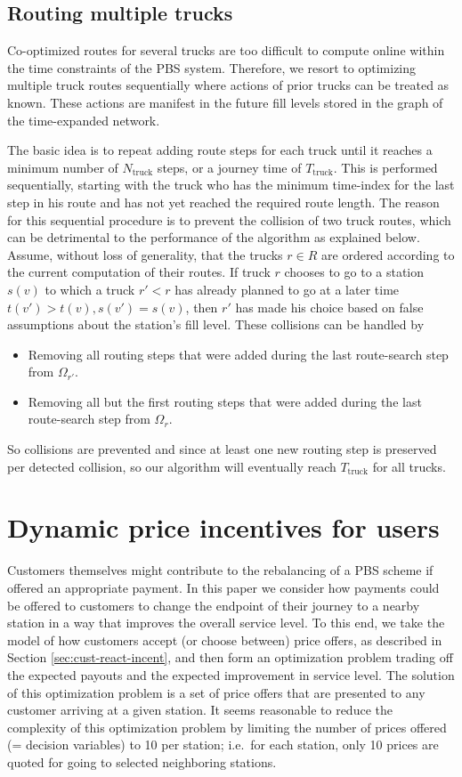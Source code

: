\documentclass{article}
\providecommand{\Ntruck}{N_{\textrm{truck}}}
\providecommand{\Ttruck}{T_{\textrm{truck}}}
\begin{document}
\subsection{Routing multiple trucks}\label{sec:multiple}
Co-optimized routes for several trucks are too difficult to compute online
within the time constraints of the PBS system. Therefore, we resort to
optimizing multiple truck routes sequentially where actions of prior trucks can
be treated as known. These actions are manifest in the future fill levels stored
in the graph of the time-expanded network.

The basic idea is to repeat adding route steps for each truck until it reaches a
minimum number of $\Ntruck$ steps, or a journey time of $\Ttruck$. This is
performed sequentially, starting with the truck who has the minimum time-index
for the last step in his route and has not yet reached the required route
length. The reason for this sequential procedure is to prevent the collision of
two truck routes, which can be detrimental to the performance of the algorithm
as explained below. Assume, without loss of generality, that the trucks $r\in R$
are ordered according to the current computation of their routes. If truck $r$
chooses to go to a station $s(v)$ to which a truck $r'<r$ has already planned to
go at a later time $t(v')>t(v), s(v') = s(v)$, then $r'$ has made his choice
based on false assumptions about the station's fill level. These collisions can
be handled by
\begin{itemize}
\item Removing all routing steps that were added during the last route-search
  step from $\Omega_{r'}$.
\item Removing all but the first routing steps that were added during the last
  route-search step from $\Omega_r$.
\end{itemize}

So collisions are prevented and since at least one new routing step is preserved
per detected collision, so our algorithm will eventually reach $\Ttruck$ for all
trucks.

\section{Dynamic price incentives for users}
\label{sec:pricing}

Customers themselves might contribute to the rebalancing of a PBS scheme if
offered an appropriate payment. In this paper we consider how payments could be
offered to customers to change the endpoint of their journey to a nearby station
in a way that improves the overall service level. To this end, we take the model
of how customers accept (or choose between) price offers, as described in
Section \ref{sec:cust-react-incent}, and then form an optimization problem
trading off the expected payouts and the expected improvement in service level.
The solution of this optimization problem is a set of price offers that are presented
to any customer arriving at a given station. It seems reasonable to reduce the
complexity of this optimization problem by limiting the number of prices offered
(= decision variables) to 10 per station; i.e.\ for each station, only 10 prices
are quoted for going to selected neighboring stations.
\end{document}
